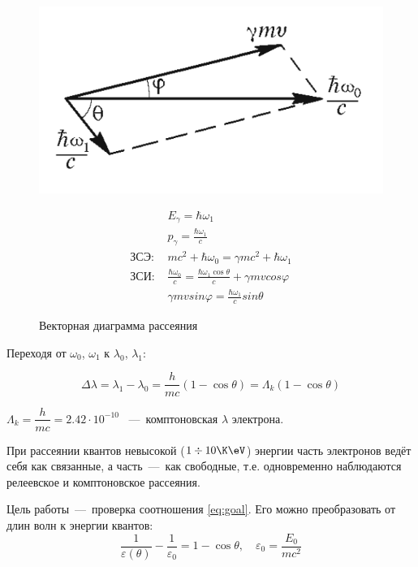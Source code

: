 \documentclass[12pt]{article}
\newcommand{\lw}{\linewidth}
\begin{document}
\begin{figure}[h] 
\begin{minipage}[h]{0.48 \lw}
    \centering
    \includegraphics[width=0.8\linewidth]{01}
    \caption{Векторная диаграмма рассеяния}
\end{minipage}
\hfill
\begin{minipage}[h]{0.48 \lw}
\begin{align}
    &E_\gamma = \hbar\omega_1 \\
    &p_\gamma = \frac{\hbar\omega_1}{c} \\
    \text{ЗСЭ: }& mc^2+\hbar \omega_0 = \gamma mc^2+\hbar \omega_1 \\
    \text{ЗСИ: }& \frac{\hbar\omega_0}{c} = \frac{\hbar\omega_1\cos\theta}{c}+\gamma mvcos\varphi \\
    &\gamma mvsin\varphi = \frac{\hbar\omega_1}{c}sin\theta
\end{align}     
\end{minipage}
\end{figure}

Переходя от $\omega_0$, $\omega_1$ к $\lambda_0$, $\lambda_1$:

\begin{equation}
\Delta\lambda=\lambda_1-\lambda_0=\dfrac{h}{mc}(1-\cos\theta)=\Lambda_k(1-\cos\theta)
\label{eq:goal}
\end{equation}
	
$\Lambda_k = \dfrac{h}{mc} = 2.42\cdot 10^{-10}$ \cm~---~комптоновская $\lambda$ электрона.

При рассеянии квантов невысокой ($ 1 \div 10 \K \eV$) энергии часть электронов ведёт себя как связанные, а часть~---~как свободные, т.е. одновременно наблюдаются релеевское и комптоновское рассеяния.
		
Цель работы~---~проверка соотношения \eqref{eq:goal}. Его можно преобразовать от длин волн к энергии квантов:
\[\frac{1}{\varepsilon(\theta)}-\frac{1}{\varepsilon_0}=1-\cos\theta, \quad \varepsilon_0=\frac{E_0}{mc^2} \]
\end{document}
